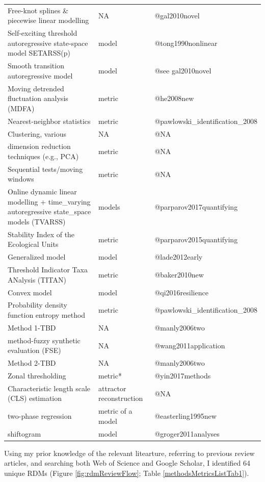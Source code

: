 \documentclass[12pt,twoside,openany]{reedthesis}
\begin{document}
\begin{longtable}{lll}
Free-knot splines \& piecewise linear modelling & NA & @gal2010novel\\
Self-exciting threshold autoregressive state-space model SETARSS(p) & model & @tong1990nonlinear\\
\addlinespace
Smooth transition autoregressive model & model & @see gal2010novel\\
Moving detrended fluctuation analysis (MDFA) & metric & @he2008new\\
Nearest-neighbor statistics & metric & @pawlowski\_identification\_2008\\
Clustering, various & NA & @NA\\
dimension reduction techniques (e.g., PCA) & metric & @NA\\
\addlinespace
Sequential tests/moving windows & metric & @NA\\
Online dynamic linear modelling +  time\_varying autoregressive state\_space models (TVARSS) & models & @parparov2017quantifying\\
Stability Index of the Ecological Units & metric & @parparov2015quantifying\\
Generalized model & model & @lade2012early\\
Threshold Indicator Taxa ANalysis (TITAN) & metric & @baker2010new\\
\addlinespace
Convex model & model & @qi2016resilience\\
Probability density function entropy method & metric & @pawlowski\_identification\_2008\\
Method 1-TBD & NA & @manly2006two\\
method-fuzzy synthetic evaluation (FSE) & NA & @wang2011application\\
Method 2-TBD & NA & @manly2006two\\
\addlinespace
Zonal thresholding & metric* & @yin2017methods\\
Characteristic length scale (CLS) estimation & attractor reconstruction & @NA\\
two-phase regression & metric of a model & @easterling1995new\\
shiftogram & model & @groger2011analyses\\*
\end{longtable}
Using my prior knowledge of the relevant litearture, referring to
previous review articles, and searching both Web of Science and Google
Scholar, I identified 64 unique RDMs (Figure \ref{fig:rdmReviewFlow};
Table \ref{methodsMetricsListTab1}).
\end{document}
